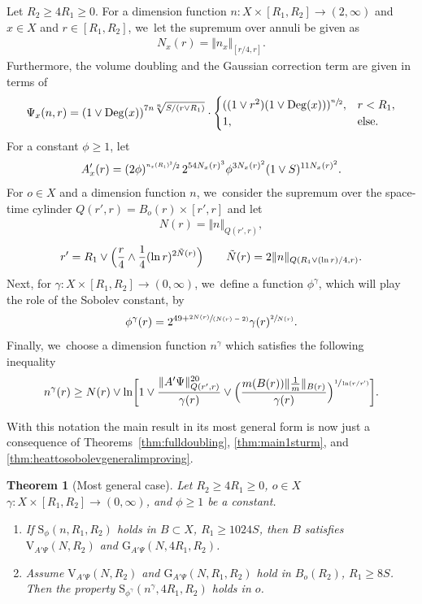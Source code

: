 \documentclass[10pt]{amsart}
\newenvironment{enumeratei}
{\bgroup\def\theenumi{\roman{enumi}}\def\theenumii{\arabic{enumii}}\begin{enumerate}}
{\end{enumerate}\egroup}
\newcommand{\spfrac}[2]{\sfrac{#1}{(#2)}}
\newcommand{\rG}{\mathrm{G}}
\newcommand{\rS}{\mathrm{S}}
\newcommand{\rV}{\mathrm{V}}
\theoremstyle{plain}
\newtheorem{theorem}{Theorem}[section]
\theoremstyle{definition}
\DeclareMathOperator{\Deg}{Deg}
\begin{document}
Let $R_{2}\ge {4}R_1\geq0$. For a dimension function $n\colon X\times [R_1,R_2]\to (2,\infty)$ and $ x\in X $ and $ r\in [R_{1},R_2] $, we~let the supremum over annuli be given as
\begin{align*}
N_x(r)=\Vert n_x\Vert_{[r/4,r]}.
\end{align*}
Furthermore, the volume doubling and the Gaussian correction term are given in terms of
\[
\Psi_x(n,r)
=\left(1\vee\Deg(x)\right)^{7n\sqrt[n]{S/(r\vee R_1)}}
\cdot \begin{cases}
((1\vee r^2)(1\vee \Deg(x)))^{\sfrac{n}{2}},& r<R_1,
\\
1,& \text{else.}
\end{cases}
\]
For a constant $ \phi\ge 1$, let
\[
A_x'(r)
=(2\phi)^{\sfrac{n_x(R_1)^2}{2}}\, 2^{54N_x(r)^3}\phi^{3N_x(r)^2}(1\vee S)^{11N_x(r)^2}.
\]
For $o\in X$ and a dimension function $ n $, we~consider the supremum over the space-time cylinder
$ Q(r',r)=B_o(r)\times [r',r] $ and let
\begin{align*}
N(r)=\Vert n\Vert_{Q(r',r)},
\end{align*}
\[
r'= R_1\vee\Bigl( \frac{r}{4}\wedge \frac{1}{4}(\ln r)^{2\tilde N(r)}\Bigr)\qquad {\tilde N(r)=2\|n\|_{Q(R_1\vee (\ln r)/4,r)}}.
\]
Next, for
$\gamma\colon X\times [R_1,R_2]\to (0,\infty)$, we~define a function $ \phi^{\gamma} $, which will play the role of the Sobolev constant, by
\begin{equation*}
\phi^{\gamma}(r)=2^{{49}+\spfrac{2N(r)}{N(r)-2}}\gamma(r)^{\sfrac{2}{N(r)}}.
\end{equation*}
Finally, we~choose a dimension function $ n^{\gamma}$ which satisfies the following inequality
\begin{align*}
n^{\gamma}(r)\geq N(r)\vee \ln\biggl[1\vee
\frac{{\Vert A'\Psi\Vert_{Q(r',r)}^{20}}}{\gamma(r)}\vee \Bigl(\frac{m(B(r))\Vert \tfrac1m\Vert_{B(r)}}{\gamma(r)}\Bigr)^{\sfrac{1}{\ln(r/r')}}
\biggr].
\end{align*}

With this notation the main result in its most general form is now just a consequence of Theorems~\ref{thm:fulldoubling}, \ref{thm:main1sturm}, and \ref{thm:heattosobolevgeneralimproving}.

\begin{theorem}[Most general case]\label{thm:general}Let
$ R_2\geq {4}R_1\geq 0$, {$o\in X$} $\gamma\colon X\times [R_1,R_2]\to (0,\infty)$, and $ \phi\ge 1$ be a constant.
\begin{enumeratei}
\item If $\rS_\phi (n,R_1,R_2)$ holds in $B\subset X$, $R_1\geq 1024S$, then
$B$ satisfies $\rV_{\!A'{\Psi}}(N,R_2)$ and $\rG_{A'\Psi}(N,4R_1,R_2)$.
\item
Assume $\rV_{\!A'{\Psi}} (N,R_2)$ and $\rG_{A'\Psi}(N,R_1,R_2)$ hold in $B_o(R_2)$, $R_1\geq 8S$. Then the property $\rS_{\phi^{\gamma}}(n^{\gamma},4 R_1,R_2)$ holds in $o$.
\end{enumeratei}
\end{theorem}
\end{document}
